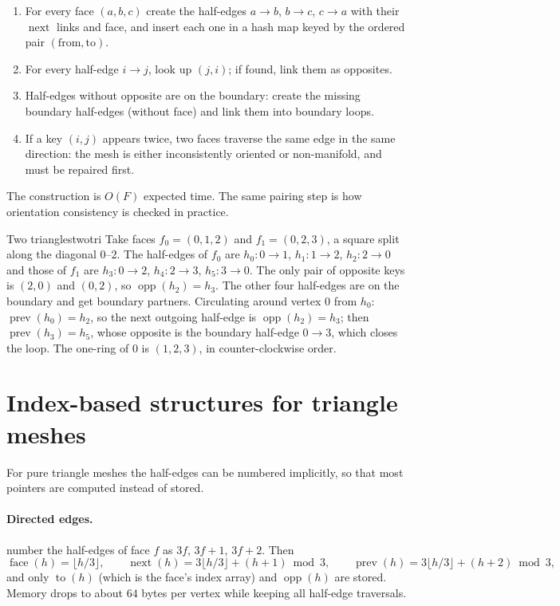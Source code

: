 \begin{enumerate}
  \item For every face $(a,b,c)$ create the half-edges $a\to b$, $b\to c$, $c\to a$ with their
  $\operatorname{next}$ links and face, and insert each one in a hash map keyed by the ordered pair
  $(\text{from},\text{to})$.
  \item For every half-edge $i\to j$, look up $(j,i)$; if found, link them as opposites.
  \item Half-edges without opposite are on the boundary: create the missing boundary half-edges
  (without face) and link them into boundary loops.
  \item If a key $(i,j)$ appears twice, two faces traverse the same edge in the same direction: the
  mesh is either inconsistently oriented or non-manifold, and must be repaired first.
\end{enumerate}
The construction is $O(F)$ expected time. The same pairing step is how orientation consistency is
checked in practice.

\begin{example}{Two triangles}{twotri}
Take faces $f_0=(0,1,2)$ and $f_1=(0,2,3)$, a square split along the diagonal $0$--$2$. The
half-edges of $f_0$ are $h_0:0\to1$, $h_1:1\to2$, $h_2:2\to0$ and those of $f_1$ are $h_3:0\to2$,
$h_4:2\to3$, $h_5:3\to0$. The only pair of opposite keys is $(2,0)$ and $(0,2)$, so
$\operatorname{opp}(h_2)=h_3$. The other four half-edges are on the boundary and get boundary
partners. Circulating around vertex $0$ from $h_0$: $\operatorname{prev}(h_0)=h_2$, so the next
outgoing half-edge is $\operatorname{opp}(h_2)=h_3$; then $\operatorname{prev}(h_3)=h_5$, whose
opposite is the boundary half-edge $0\to3$, which closes the loop. The one-ring of $0$ is
$(1,2,3)$, in counter-clockwise order.
\end{example}

\section{Index-based structures for triangle meshes}

For pure triangle meshes the half-edges can be numbered implicitly, so that most pointers are
computed instead of stored.

\paragraph{Directed edges.} \citet{Campagna1998} number the half-edges of face $f$ as $3f$,
$3f+1$, $3f+2$. Then
\begin{equation}
\operatorname{face}(h)=\lfloor h/3\rfloor,\qquad
\operatorname{next}(h)=3\lfloor h/3\rfloor+(h+1)\bmod 3,\qquad
\operatorname{prev}(h)=3\lfloor h/3\rfloor+(h+2)\bmod 3,
\end{equation}
and only $\operatorname{to}(h)$ (which is the face's index array) and $\operatorname{opp}(h)$ are
stored. Memory drops to about $64$ bytes per vertex while keeping all half-edge traversals.

